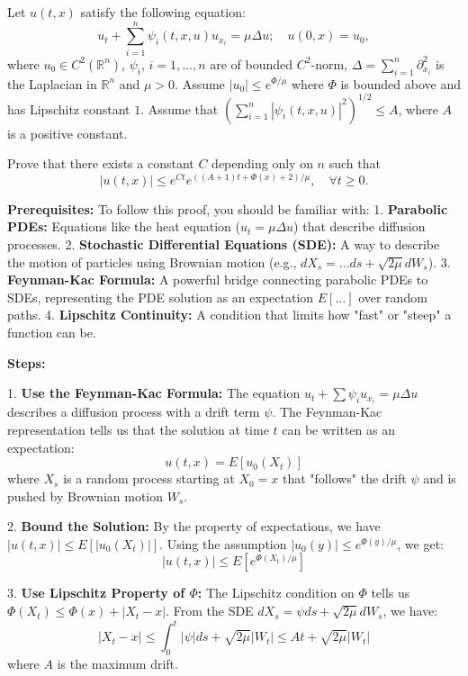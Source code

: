 \begin{exercise}
\label{analysis:2023:6}
Let $u(t,x)$ satisfy the following equation:
\[
u_t + \sum_{i=1}^n \psi_i(t,x,u)u_{x_i} = \mu\Delta u;\quad u(0,x) = u_0,
\]
where $u_0\in C^2(\mathbb{R}^n)$, $\psi_i$, $i=1,\ldots,n$ are of bounded $C^2$-norm, $\Delta = \sum_{i=1}^n \partial_{x_i}^2$ is the Laplacian in $\mathbb{R}^n$ and $\mu>0$. Assume $|u_0|\leq e^{\Phi/\mu}$ where $\Phi$ is bounded above and has Lipschitz constant $1$. Assume that $\left(\sum_{i=1}^n|\psi_i(t,x,u)|^2\right)^{1/2}\leq A$, where $A$ is a positive constant.

Prove that there exists a constant $C$ depending only on $n$ such that
\[
|u(t,x)| \leq e^{Ct}e^{((A+1)t+\Phi(x)+2)/\mu}, \quad \forall t\geq 0.
\]
\end{exercise}

\begin{solution}
\textbf{Prerequisites:}
To follow this proof, you should be familiar with:
1. \textbf{Parabolic PDEs:} Equations like the heat equation ($u_t = \mu \Delta u$) that describe diffusion processes.
2. \textbf{Stochastic Differential Equations (SDE):} A way to describe the motion of particles using Brownian motion (e.g., $dX_s = \dots ds + \sqrt{2\mu} dW_s$).
3. \textbf{Feynman-Kac Formula:} A powerful bridge connecting parabolic PDEs to SDEs, representing the PDE solution as an expectation $E[\dots]$ over random paths.
4. \textbf{Lipschitz Continuity:} A condition that limits how "fast" or "steep" a function can be.

\textbf{Steps:}

1. \textbf{Use the Feynman-Kac Formula:}
The equation $u_t + \sum \psi_i u_{x_i} = \mu \Delta u$ describes a diffusion process with a drift term $\psi$. The Feynman-Kac representation tells us that the solution at time $t$ can be written as an expectation:
\[ u(t, x) = E[u_0(X_t)] \]
where $X_s$ is a random process starting at $X_0=x$ that "follows" the drift $\psi$ and is pushed by Brownian motion $W_s$.

2. \textbf{Bound the Solution:}
By the property of expectations, we have $|u(t, x)| \leq E[|u_0(X_t)|]$. Using the assumption $|u_0(y)| \leq e^{\Phi(y)/\mu}$, we get:
\[ |u(t, x)| \leq E[e^{\Phi(X_t)/\mu}] \]

3. \textbf{Use Lipschitz Property of $\Phi$:}
The Lipschitz condition on $\Phi$ tells us $\Phi(X_t) \leq \Phi(x) + |X_t - x|$. From the SDE $dX_s = \psi ds + \sqrt{2\mu} dW_s$, we have:
\[ |X_t - x| \leq \int_0^t |\psi| ds + \sqrt{2\mu} |W_t| \leq At + \sqrt{2\mu} |W_t| \]
where $A$ is the maximum drift.


\end{solution}

